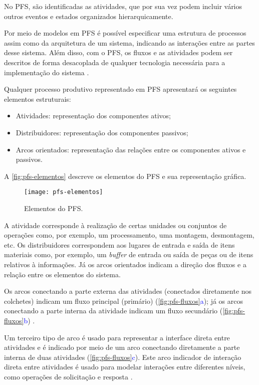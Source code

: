 No PFS, são identificadas as atividades, que por sua vez podem incluir vários outros eventos e estados organizados hierarquicamente.

Por meio de modelos em PFS é possível especificar uma estrutura de processos assim como da arquitetura de um sistema, indicando as interações entre as partes desse sistema. Além disso, com o PFS, os fluxos e as atividades podem ser descritos de forma desacoplada de qualquer tecnologia necessária para a implementação do sistema \cite{pisching2018equipmentrami}.

Qualquer processo produtivo representado em PFS apresentará os seguintes elementos estruturais:

\begin{itemize}
	\item Atividades: representação dos componentes ativos;
	\item Distribuidores: representação dos componentes passivos;
	\item Arcos orientados: representação das relações entre os componentes ativos  e passivos.
\end{itemize}

A \autoref{fig:pfs-elementos} descreve os elementos do PFS e sua representação gráfica.

\begin{figure}[htb]
	\centering
	\texttt{[image: pfs-elementos]}
	\caption{Elementos do PFS.}
	\label{fig:pfs-elementos}
\end{figure}

A atividade corresponde à realização de certas unidades ou conjuntos de operações como, por exemplo, um processamento, uma montagem, desmontagem, etc. Os distribuidores correspondem aos lugares de entrada e saída de itens materiais como, por exemplo, um \textit{buffer} de entrada ou saída de peças ou de itens relativos à informações. Já os arcos orientados indicam a direção dos fluxos e a relação entre os elementos do sistema.

Os arcos conectando a parte externa das atividades (conectados diretamente nos colchetes) indicam um fluxo principal (primário) (\autoref{fig:pfs-fluxos}\textcolor{blue}{a}); já os arcos conectando a parte interna da atividade indicam um fluxo secundário (\autoref{fig:pfs-fluxos}\textcolor{blue}{b}) \cite{miyagi1996controle}.

Um terceiro tipo de arco é usado para representar a interface direta entre atividades e é indicado por meio de um arco conectando diretamente a parte interna de duas atividades (\autoref{fig:pfs-fluxos}\textcolor{blue}{c}). Este arco indicador de interação direta entre atividades é usado para modelar interações entre diferentes níveis, como operações de solicitação e resposta \cite{pisching2018pfs}.

